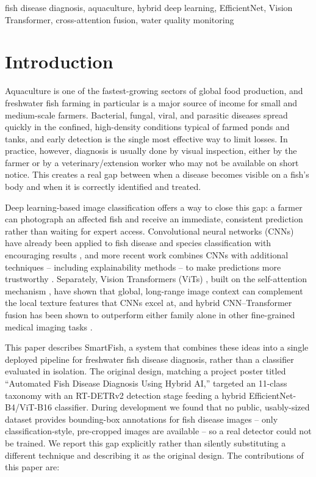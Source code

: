 \documentclass[conference]{IEEEtran}
\begin{document}
\begin{IEEEkeywords}
fish disease diagnosis, aquaculture, hybrid deep learning, EfficientNet, Vision Transformer, cross-attention fusion, water quality monitoring
\end{IEEEkeywords}

\section{Introduction}

Aquaculture is one of the fastest-growing sectors of global food production, and freshwater fish farming in particular is a major source of income for small and medium-scale farmers. Bacterial, fungal, viral, and parasitic diseases spread quickly in the confined, high-density conditions typical of farmed ponds and tanks, and early detection is the single most effective way to limit losses. In practice, however, diagnosis is usually done by visual inspection, either by the farmer or by a veterinary/extension worker who may not be available on short notice. This creates a real gap between when a disease becomes visible on a fish's body and when it is correctly identified and treated.

Deep learning-based image classification offers a way to close this gap: a farmer can photograph an affected fish and receive an immediate, consistent prediction rather than waiting for expert access. Convolutional neural networks (CNNs) have already been applied to fish disease and species classification with encouraging results \cite{dash2024,ergun2025}, and more recent work combines CNNs with additional techniques -- including explainability methods -- to make predictions more trustworthy \cite{utku2026}. Separately, Vision Transformers (ViTs) \cite{vit2021}, built on the self-attention mechanism \cite{attention2017}, have shown that global, long-range image context can complement the local texture features that CNNs excel at, and hybrid CNN--Transformer fusion has been shown to outperform either family alone in other fine-grained medical imaging tasks \cite{jayaraman2025}.

This paper describes SmartFish, a system that combines these ideas into a single deployed pipeline for freshwater fish disease diagnosis, rather than a classifier evaluated in isolation. The original design, matching a project poster titled ``Automated Fish Disease Diagnosis Using Hybrid AI,'' targeted an 11-class taxonomy with an RT-DETRv2 \cite{rtdetr2023} detection stage feeding a hybrid EfficientNet-B4/ViT-B16 classifier. During development we found that no public, usably-sized dataset provides bounding-box annotations for fish disease images -- only classification-style, pre-cropped images are available -- so a real detector could not be trained. We report this gap explicitly rather than silently substituting a different technique and describing it as the original design. The contributions of this paper are:
\end{document}
